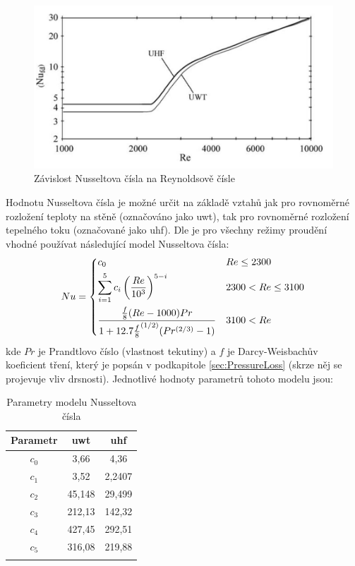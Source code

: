 \begin{figure}[h] \centering \capstart
  \includegraphics[scale=0.3]{figures/nusselt}
  \caption{Závislost Nusseltova čísla na Reynoldsově čísle \cite{Abraham2009}}
  \label{fig:NuReynolds}
\end{figure}
Hodnotu Nusseltova čísla je možné určit na základě vztahů jak pro rovnoměrné
rozložení teploty na stěně (označováno jako \acrshort{uwt}), tak pro rovnoměrné
rozložení tepelného toku (označované jako \acrshort{uhf}). Dle
\cite{Abraham2009} je pro všechny režimy proudění vhodné používat následující
model Nusseltova čísla:
\begin{equation}
\label{eq:NuModel}
  Nu =
  \begin{dcases}
    c_0 & Re\leq 2300 \\
    \sum_{i=1}^{5} c_i\left(\frac{Re}{10^3}\right)^{5-i} & 2300 < Re\le 3100 \\
    \frac{\frac{f}{8}(Re-1000)Pr}
    {1+12.7{\frac{f}{8}}^{(1/2)}(Pr^{(2/3)}-1)} & 3100 < Re
  \end{dcases}
\end{equation}
kde \(Pr\) je Prandtlovo číslo (vlastnost tekutiny) a \(f\) je Darcy-Weisbachův
koeficient tření, který je popsán v podkapitole \ref{sec:PressureLoss} (skrze
něj se projevuje vliv drsnosti). Jednotlivé hodnoty parametrů tohoto modelu
jsou:
\begin{table}[H]
  \label{tab:NuModel}
  \caption{Parametry modelu Nusseltova čísla}
  \centering
  \begin{tabular}{ccc}
    \toprule
    Parametr & \acrshort{uwt} & \acrshort{uhf} \\ [0.5ex]
    \hline
    \(c_0\) & 3,66 & 4,36 \\
    \(c_1\) & 3,52 & 2,2407 \\
    \(c_2\) & 45,148 & 29,499 \\
    \(c_3\) & 212,13 & 142,32 \\
    \(c_4\) & 427,45 & 292,51 \\
    \(c_5\) & 316,08 & 219,88 \\
    \bottomrule \\[0.1mm]
  \end{tabular}
\end{table}
